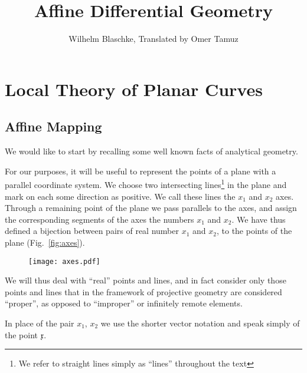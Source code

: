 \documentclass[11pt]{book} \usepackage{amssymb}
\newcommand{\myvec}[1]{\mathfrak{#1}}
\begin{document}
\title{Affine Differential Geometry}

 \author{Wilhelm Blaschke, Translated by Omer Tamuz}
\maketitle

\chapter{Local Theory of Planar Curves}
\section{Affine Mapping}
We would like to start by recalling some well known facts of analytical 
geometry.

For our purposes, it will be useful to represent the points of a plane with
a parallel coordinate system. We choose two intersecting lines\footnote{We
refer to straight lines simply as ``lines'' throughout the text}
in the plane and mark on each some direction as positive. We call these lines
the $x_1$ and $x_2$ axes. Through a remaining point of the plane we pass
parallels to the axes, and assign the corresponding segments of the axes 
the numbers $x_1$ and $x_2$. We have thus defined a bijection between 
pairs of real number $x_1$ and $x_2$, to the points of the plane 
(Fig.~\ref{fig:axes}).

\begin{figure}[htp]
  \label{fig:axes}
  \centering
  \texttt{[image: axes.pdf]}
  \caption{}
\label{fig_embedded}
\end{figure}

We will thus deal with ``real'' points and lines, and in fact consider only
those points and lines that in the framework of projective geometry are 
considered ``proper'', as opposed to ``improper'' or infinitely remote elements.

In place of the pair $x_1$, $x_2$ we use the shorter vector notation and 
speak simply of the point $\myvec{x}$.
\end{document}
